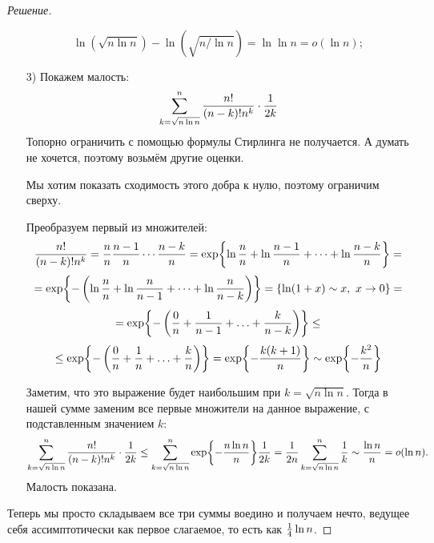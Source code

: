 \documentclass[12pt,a4paper]{extarticle}
\begin{document}
\begin{proof}[Решение]
\begin{itemize}
			\[
				\ln\left( \sqrt{n \ln n} \right) - \ln\left( \sqrt{n /\ln n} \right) = \ln \ln n = o(\ln n);
			\]
			\item[3)] Покажем малость:
			\[
				\sum_{k=\sqrt{n \ln n}}^{n} {n! \over (n-k)!n^{k}}\cdot {1\over 2k}
			\]
			Топорно ограничить с помощью формулы Стирлинга не получается. А думать не хочется, поэтому возьмём другие оценки. 
			
			Мы хотим показать сходимость этого добра к нулю, поэтому ограничим сверху.
			
			Преобразуем первый из множителей:
			\[
				{n! \over (n-k)!n^{k}} = {n \over n}  {n - 1\over n}  \cdots  {n-k \over n} = \exp{\ln{n \over n} + \ln{n - 1\over n} + \cdots + \ln{n-k \over n}} = 
			\]
			\[
				=  \exp{-\left(\ln{n \over n} + \ln{n\over n - 1} + \cdots + \ln{n \over n - k}\right)} = \{\ln (1 + x) \sim x, ~x\rightarrow 0\} =
			\]
			\[
				=\exp{-\left({0 \over n} + {1\over n - 1} + \ldots + {k \over n - k}\right)} \leq
			\]
			\[
				\leq \exp{-\left({0 \over n} + {1\over n} + \ldots + {k \over n}\right)} = \exp{-{k(k+1) \over n}} \sim \exp{-{k^2 \over n}}
			\]
			
			Заметим, что это выражение будет наибольшим при $k = \sqrt{n \ln n}$. Тогда в нашей сумме заменим все первые множители на данное выражение, с подставленным значением $k$:
			\[
				\sum_{k=\sqrt{n \ln n}}^{n} {n! \over (n-k)!n^{k}}\cdot {1\over 2k} \leq \sum_{k=\sqrt{n \ln n}}^{n} \exp{-{n \ln n \over n}} {1\over 2k} 
				=
				{1\over 2n} \sum_{k=\sqrt{n \ln n}}^{n} {1\over k} \sim {\ln n \over n} = o(\ln n).
			\] 
			Малость показана.
		\end{itemize}
		Теперь мы просто складываем все три суммы воедино и получаем нечто, ведущее себя ассимптотически как первое слагаемое, то есть как ${1\over 4} \ln n$.
		
	\end{proof}
	
	

	
	
\end{document}
